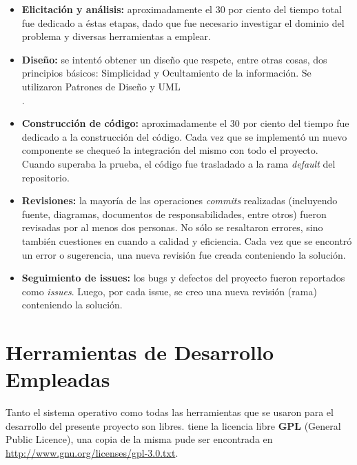 \begin{itemize}
    \item \textbf{Elicitación y análisis:} aproximadamente el 30 por ciento del tiempo total fue dedicado a éstas etapas, dado que fue necesario investigar el dominio del problema y diversas herramientas a emplear.     

    \item \textbf{Diseño:} se intentó obtener un diseño que respete, entre otras cosas, dos principios básicos: Simplicidad y Ocultamiento de la información. Se utilizaron Patrones de Diseño\cite{Gamma} y UML \\ \cite{uml}.

    \item \textbf{Construcción de código:} aproximadamente el 30 por ciento del tiempo fue dedicado a la construcción del código. Cada vez que se implementó un nuevo componente se chequeó la integración del mismo con todo el proyecto. Cuando superaba la prueba, el código fue trasladado a la rama \emph{default} del repositorio.

    \item \textbf{Revisiones:} la mayoría de las operaciones \emph{commits} realizadas (incluyendo fuente, diagramas, documentos de responsabilidades, entre otros) fueron revisadas por al menos dos personas. No sólo se resaltaron errores, sino también cuestiones en cuando a calidad y eficiencia. Cada vez que se encontró un error o sugerencia, una nueva revisión fue creada conteniendo la solución.

    \item \textbf{Seguimiento de issues:} los bugs y defectos del proyecto fueron reportados como \emph{issues}. Luego, por cada issue, se creo una nueva revisión (rama) conteniendo la solución.
\end{itemize}

\section{Herramientas de Desarrollo Empleadas}
\par Tanto el sistema operativo como todas las herramientas que se usaron para el desarrollo del presente proyecto son libres. \remo tiene la licencia libre \textbf{GPL} (General Public Licence), una copia de la misma pude ser encontrada en \url{http://www.gnu.org/licenses/gpl-3.0.txt}.

